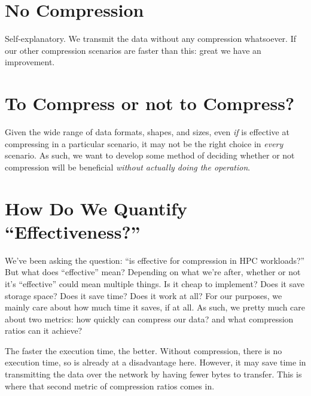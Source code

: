 \section{No Compression}
\label{sec:no-compress-method}
Self-explanatory. We transmit the data without any compression whatsoever. If
our other compression scenarios are faster than this: great we have an
improvement.



\section{To Compress or not to Compress?}
\label{sec:compress-or-not}
Given the wide range of data formats, shapes, and sizes, even \emph{if}
\openzl{} is effective at compressing in a particular scenario, it may not be the
right choice in \emph{every} scenario. As such, we want to develop some method
of deciding whether or not compression will be beneficial \emph{without actually
doing the operation}.


\section{How Do We Quantify ``Effectiveness?''}
\label{sec:quantifying-effectiveness}
We've been asking the question: ``is \openzl{} effective for compression in HPC
workloads?'' But what does ``effective'' mean? Depending on what we're after,
whether or not it's ``effective'' could mean multiple things. Is it cheap to
implement? Does it save storage space? Does it save time? Does it work at all?
For our purposes, we mainly care about how much time it saves, if at all. As
such, we pretty much care about two metrics: how quickly can \openzl{} compress
our data? and what compression ratios can it achieve?

The faster the execution time, the better. Without compression, there is no
execution time, so \openzl{} is already at a disadvantage here. However, it may
save time in transmitting the data over the network by having fewer bytes to
transfer. This is where that second metric of compression ratios comes in.
